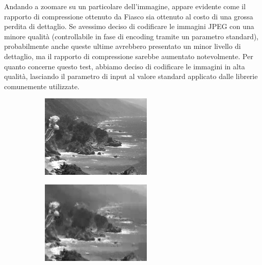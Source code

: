 \documentclass[11pt,a4paper,appendixprefix=true,numbers=noenddot]{scrreprt}
\begin{document}
Andando a zoomare su un particolare dell'immagine, appare evidente come il rapporto di compressione ottenuto da Fiasco sia ottenuto al costo di una grossa perdita di dettaglio. Se avessimo deciso di codificare le immagini JPEG con una minore qualità (controllabile in fase di encoding tramite un parametro standard), probabilmente anche queste ultime avrebbero presentato un minor livello di dettaglio, ma il rapporto di compressione sarebbe aumentato notevolmente. Per quanto concerne questo test, abbiamo deciso di codificare le immagini in alta qualità, lasciando il parametro di input al valore standard applicato dalle librerie comunemente utilizzate.

\begin{figure}[!ht]
  \centering
    \begin{subfigure}[t]{0.47\textwidth}
        \includegraphics[width=\textwidth]{images/california-coast-jpeg-detail.png}
    \end{subfigure}
    \begin{subfigure}[t]{0.47\textwidth}
        \includegraphics[width=\textwidth]{images/california-coast-fiasco-detail.png}
    \end{subfigure}
    

\end{figure}
\end{document}
